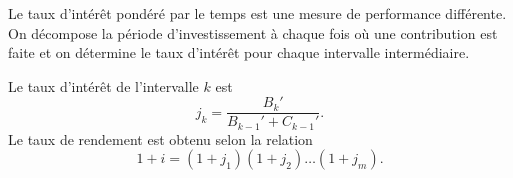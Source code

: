 Le taux d'intérêt pondéré par le temps est une mesure de performance différente. On décompose la période d'investissement à chaque fois où une contribution est faite et on détermine le taux d'intérêt pour chaque intervalle intermédiaire. 

Le taux d'intérêt de l'intervalle $k$ est $$j_k = \frac{B_k'}{B_{k-1}' + C_{k-1}'}.$$
Le taux de rendement est obtenu selon la relation
$$1 + i = (1+j_1)(1+j_2)\dots(1+j_m).$$




































